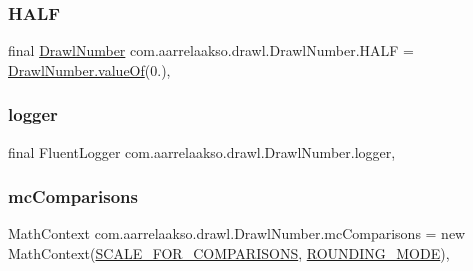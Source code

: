 \subsubsection{\texorpdfstring{H\+A\+LF}{HALF}}
{\footnotesize\ttfamily final \hyperlink{classcom_1_1aarrelaakso_1_1drawl_1_1_drawl_number}{Drawl\+Number} com.\+aarrelaakso.\+drawl.\+Drawl\+Number.\+H\+A\+LF = \hyperlink{classcom_1_1aarrelaakso_1_1drawl_1_1_drawl_number_a4654022f4252c55f6aebd69494db301c}{Drawl\+Number.\+value\+Of}(0.)\hspace{0.3cm}{\ttfamily [static]}, {\ttfamily [protected]}}

\mbox{\label{classcom_1_1aarrelaakso_1_1drawl_1_1_drawl_number_ad2eb8e8b4021e0d474b39f06e81ff9e7}} 
\subsubsection{\texorpdfstring{logger}{logger}}
{\footnotesize\ttfamily final Fluent\+Logger com.\+aarrelaakso.\+drawl.\+Drawl\+Number.\+logger\hspace{0.3cm}{\ttfamily [static]}, {\ttfamily [private]}}

\mbox{\label{classcom_1_1aarrelaakso_1_1drawl_1_1_drawl_number_a520b230ee4ceb0e1bef368ace676a954}} 
\subsubsection{\texorpdfstring{mc\+Comparisons}{mcComparisons}}
{\footnotesize\ttfamily Math\+Context com.\+aarrelaakso.\+drawl.\+Drawl\+Number.\+mc\+Comparisons = new Math\+Context(\hyperlink{classcom_1_1aarrelaakso_1_1drawl_1_1_drawl_number_ace1cb62d1ecce8212578d1a13cf5cbc4}{S\+C\+A\+L\+E\+\_\+\+F\+O\+R\+\_\+\+C\+O\+M\+P\+A\+R\+I\+S\+O\+NS}, \hyperlink{classcom_1_1aarrelaakso_1_1drawl_1_1_drawl_number_ab4b44bb0675da90d8f435286911b711e}{R\+O\+U\+N\+D\+I\+N\+G\+\_\+\+M\+O\+DE})\hspace{0.3cm}{\ttfamily [static]}, {\ttfamily [protected]}}



